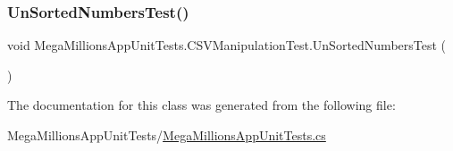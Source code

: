 \subsubsection{\texorpdfstring{Un\+Sorted\+Numbers\+Test()}{UnSortedNumbersTest()}}
{\footnotesize\ttfamily void Mega\+Millions\+App\+Unit\+Tests.\+C\+S\+V\+Manipulation\+Test.\+Un\+Sorted\+Numbers\+Test (\begin{DoxyParamCaption}{ }\end{DoxyParamCaption})}



The documentation for this class was generated from the following file\+:\begin{DoxyCompactItemize}
\item 
Mega\+Millions\+App\+Unit\+Tests/\hyperlink{_mega_millions_app_unit_tests_8cs}{Mega\+Millions\+App\+Unit\+Tests.\+cs}\end{DoxyCompactItemize}

